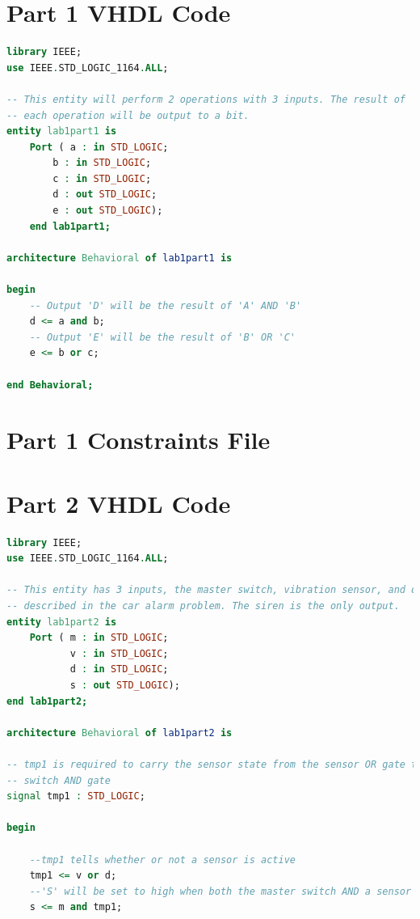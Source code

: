 \documentclass[11pt]{article}
\begin{document}
\begin{appendices}

\section{Part 1 VHDL Code}

\begin{lstlisting}[language=VHDL]
library IEEE;
use IEEE.STD_LOGIC_1164.ALL;

-- This entity will perform 2 operations with 3 inputs. The result of 
-- each operation will be output to a bit.
entity lab1part1 is
    Port ( a : in STD_LOGIC;
        b : in STD_LOGIC;
        c : in STD_LOGIC;
        d : out STD_LOGIC;
        e : out STD_LOGIC);
	end lab1part1;

architecture Behavioral of lab1part1 is

begin
   	-- Output 'D' will be the result of 'A' AND 'B'
   	d <= a and b;
   	-- Output 'E' will be the result of 'B' OR 'C'
   	e <= b or c;

end Behavioral;
\end{lstlisting}

\section{Part 1 Constraints File}

\section{Part 2 VHDL Code}

\begin{lstlisting}[language=VHDL]
library IEEE;
use IEEE.STD_LOGIC_1164.ALL;

-- This entity has 3 inputs, the master switch, vibration sensor, and door sensor
-- described in the car alarm problem. The siren is the only output.
entity lab1part2 is
    Port ( m : in STD_LOGIC;
           v : in STD_LOGIC;
           d : in STD_LOGIC;
           s : out STD_LOGIC);
end lab1part2;

architecture Behavioral of lab1part2 is

-- tmp1 is required to carry the sensor state from the sensor OR gate to the master
-- switch AND gate
signal tmp1 : STD_LOGIC;

begin

    --tmp1 tells whether or not a sensor is active
    tmp1 <= v or d;
    --'S' will be set to high when both the master switch AND a sensor are active
    s <= m and tmp1;


\end{lstlisting}
\end{appendices}
\end{document}
